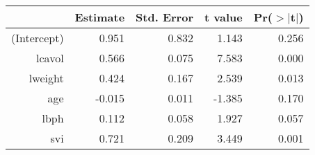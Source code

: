\begin{table}[ht]
\centering
\begin{tabular}{rrrrr}
  \hline
 & Estimate & Std. Error & t value & Pr($>$$|$t$|$) \\ 
  \hline
(Intercept) & 0.951 & 0.832 & 1.143 & 0.256 \\ 
  lcavol & 0.566 & 0.075 & 7.583 & 0.000 \\ 
  lweight & 0.424 & 0.167 & 2.539 & 0.013 \\ 
  age & -0.015 & 0.011 & -1.385 & 0.170 \\ 
  lbph & 0.112 & 0.058 & 1.927 & 0.057 \\ 
  svi & 0.721 & 0.209 & 3.449 & 0.001 \\ 
   \hline
\end{tabular}
\end{table}

